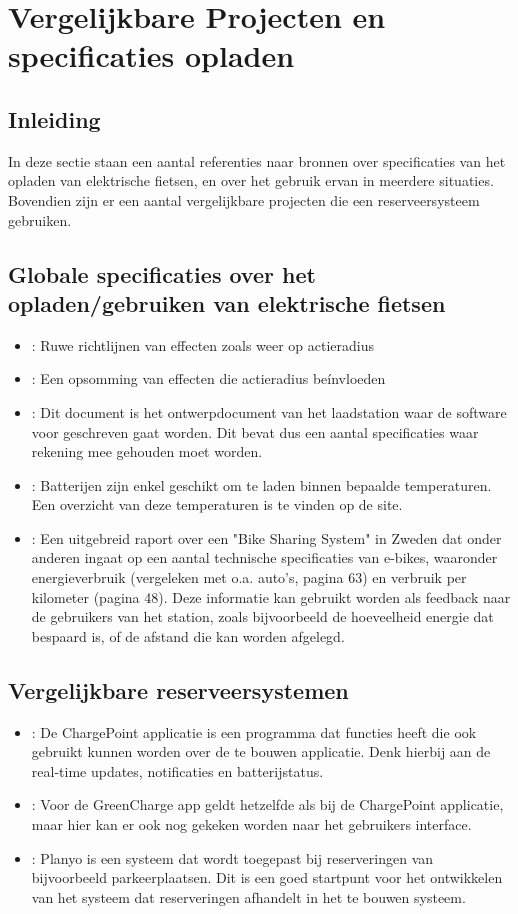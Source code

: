 \section{Vergelijkbare Projecten en specificaties opladen}
\subsection{Inleiding}
In deze sectie staan een aantal referenties naar bronnen over specificaties van het opladen van elektrische fietsen, en over het gebruik ervan in meerdere situaties. Bovendien zijn er een aantal vergelijkbare projecten die een reserveersysteem gebruiken.

\subsection{Globale specificaties over het opladen/gebruiken van elektrische fietsen}
\begin{itemize}
\item
\cite{ftsac}: Ruwe richtlijnen van effecten zoals weer op actieradius
\item
\cite{batac}: Een opsomming van effecten die actieradius be\'invloeden
\item
\cite{feas}: Dit document is het ontwerpdocument van het laadstation waar de software voor geschreven gaat worden. Dit bevat dus een aantal specificaties waar rekening mee gehouden moet worden.
\item
\cite{chargtemp}: Batterijen zijn enkel geschikt om te laden binnen bepaalde temperaturen. Een overzicht van deze temperaturen is te vinden op de site.
\item
\cite{bss}: Een uitgebreid raport over een "Bike Sharing System" in Zweden dat onder anderen ingaat op een aantal technische specificaties van e-bikes, waaronder energieverbruik (vergeleken met o.a. auto's, pagina 63) en verbruik per kilometer (pagina 48). Deze informatie kan gebruikt worden als feedback naar de gebruikers van het station, zoals bijvoorbeeld de hoeveelheid energie dat bespaard is, of de afstand die kan worden afgelegd.
\end{itemize}
\subsection{Vergelijkbare reserveersystemen}
\begin{itemize}
\item
\cite{chargepoint}: De ChargePoint applicatie is een programma dat functies heeft die ook gebruikt kunnen worden over de te bouwen applicatie. Denk hierbij aan de real-time updates, notificaties en batterijstatus.
\item
\cite{greencharge}: Voor de GreenCharge app geldt hetzelfde als bij de ChargePoint applicatie, maar hier kan er ook nog gekeken worden naar het gebruikers interface.
\item
\cite{planyo}: Planyo is een systeem dat wordt toegepast bij reserveringen van bijvoorbeeld parkeerplaatsen. Dit is een goed startpunt voor het ontwikkelen van het systeem dat reserveringen afhandelt in het te bouwen systeem.
\end{itemize}
